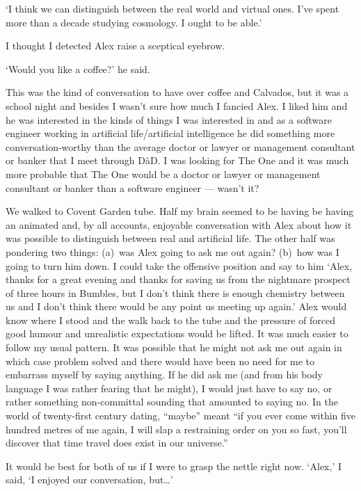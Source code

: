 `I think we can distinguish between the real world and virtual
ones. I've spent more than a decade studying cosmology. I ought to be able.'

I thought I detected Alex raise a sceptical eyebrow.

`Would you like a coffee?' he said.

This was the kind of conversation to have over coffee and
Calvados, but it was a school night and besides I wasn't sure how
much I fancied Alex. I liked him and he was interested
in the kinds of things I was interested in and as a software
engineer working in artificial
life/artificial intelligence he did something more conversation-worthy than
the average doctor or lawyer or management consultant or banker that I meet
through DàD. I was looking for The One and it was much more probable that The One would be a doctor or lawyer or management consultant or banker than a software engineer --- wasn't it?

We walked to Covent Garden tube. Half my brain seemed to be having
be having an animated and, by all accounts, enjoyable conversation
with Alex about how it was possible to distinguish between real and
artificial life. The other half was pondering two things: (a)~was
Alex going to ask me out again? (b)~how was I going to turn him
down. I could take the offensive position and say to him
`Alex, thanks for a great evening and thanks for saving us from the
nightmare prospect of three hours in Bumbles, but I don't think
there is enough chemistry between us and I don't think there would
be any point us meeting up again.' Alex would know where I stood and
the walk back to the tube and the pressure of forced good humour and
unrealistic expectations would be lifted. It was much easier to follow my usual
pattern. It was possible that
he might not ask me out again in which case problem solved and there
would have been no need for me to embarrass myself by saying
anything. If he did ask me (and from his body language I was rather
fearing that he might), I would just have to say no, or rather
something non-committal sounding that amounted to saying no. In the world of
twenty-first century dating, ``maybe'' meant ``if you ever come
within five hundred metres of me again, I will slap a restraining
order on you so fast, you'll discover that time travel does exist in
our universe.''

It would be best for both of us if I were to grasp the nettle right now. `Alex,' I said, `I enjoyed our conversation, but\dots'

